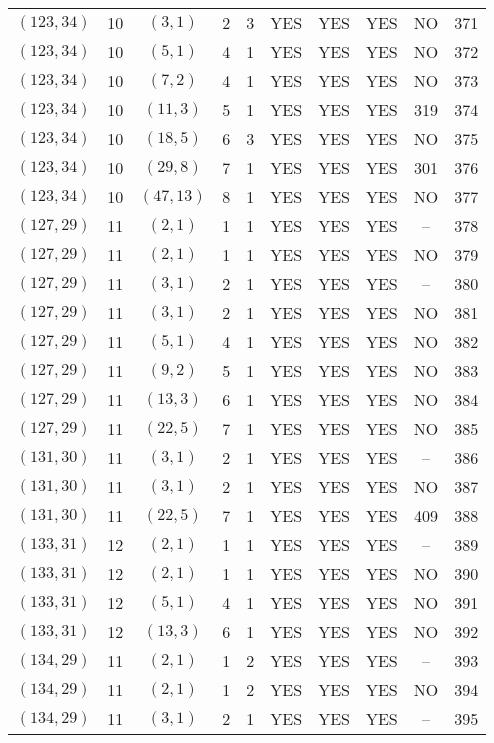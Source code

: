 \begin{longtable}{|c|c|c|c|c|c|c|c|c|c|}
$(123, 34)$ & 10 & $(3, 1)$ & 2 & 3 & YES & YES & YES & NO & 371\\
$(123, 34)$ & 10 & $(5, 1)$ & 4 & 1 & YES & YES & YES & NO & 372\\
$(123, 34)$ & 10 & $(7, 2)$ & 4 & 1 & YES & YES & YES & NO & 373\\
$(123, 34)$ & 10 & $(11, 3)$ & 5 & 1 & YES & YES & YES & 319 & 374\\
$(123, 34)$ & 10 & $(18, 5)$ & 6 & 3 & YES & YES & YES & NO & 375\\
$(123, 34)$ & 10 & $(29, 8)$ & 7 & 1 & YES & YES & YES & 301 & 376\\
$(123, 34)$ & 10 & $(47, 13)$ & 8 & 1 & YES & YES & YES & NO & 377\\
$(127, 29)$ & 11 & $(2, 1)$ & 1 & 1 & YES & YES & YES & -- & 378\\
$(127, 29)$ & 11 & $(2, 1)$ & 1 & 1 & YES & YES & YES & NO & 379\\
$(127, 29)$ & 11 & $(3, 1)$ & 2 & 1 & YES & YES & YES & -- & 380\\
$(127, 29)$ & 11 & $(3, 1)$ & 2 & 1 & YES & YES & YES & NO & 381\\
$(127, 29)$ & 11 & $(5, 1)$ & 4 & 1 & YES & YES & YES & NO & 382\\
$(127, 29)$ & 11 & $(9, 2)$ & 5 & 1 & YES & YES & YES & NO & 383\\
$(127, 29)$ & 11 & $(13, 3)$ & 6 & 1 & YES & YES & YES & NO & 384\\
$(127, 29)$ & 11 & $(22, 5)$ & 7 & 1 & YES & YES & YES & NO & 385\\
$(131, 30)$ & 11 & $(3, 1)$ & 2 & 1 & YES & YES & YES & -- & 386\\
$(131, 30)$ & 11 & $(3, 1)$ & 2 & 1 & YES & YES & YES & NO & 387\\
$(131, 30)$ & 11 & $(22, 5)$ & 7 & 1 & YES & YES & YES & 409 & 388\\
$(133, 31)$ & 12 & $(2, 1)$ & 1 & 1 & YES & YES & YES & -- & 389\\
$(133, 31)$ & 12 & $(2, 1)$ & 1 & 1 & YES & YES & YES & NO & 390\\
$(133, 31)$ & 12 & $(5, 1)$ & 4 & 1 & YES & YES & YES & NO & 391\\
$(133, 31)$ & 12 & $(13, 3)$ & 6 & 1 & YES & YES & YES & NO & 392\\
$(134, 29)$ & 11 & $(2, 1)$ & 1 & 2 & YES & YES & YES & -- & 393\\
$(134, 29)$ & 11 & $(2, 1)$ & 1 & 2 & YES & YES & YES & NO & 394\\
$(134, 29)$ & 11 & $(3, 1)$ & 2 & 1 & YES & YES & YES & -- & 395\\

\end{longtable}
